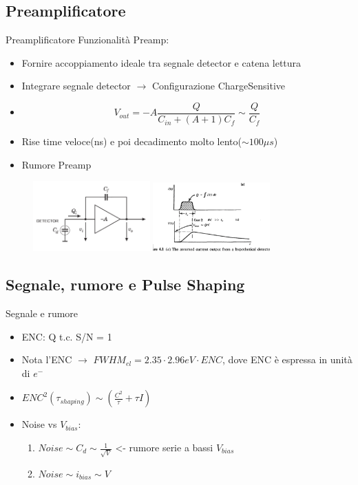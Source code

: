 \documentclass{beamer}
\begin{document}
\subsection{Preamplificatore}
\begin{frame}{Preamplificatore}
Funzionalità Preamp:
\begin{itemize}
    \item Fornire accoppiamento ideale tra segnale detector e catena lettura
    \item Integrare segnale detector $\to$ Configurazione Charge\-Sensitive
    \item \begin{equation}
            V_{out} = -A \frac{Q}{C_{in}+(A+1)C_f} \sim \frac{Q}{C_f}
        \end{equation}
    \item Rise time veloce(ns) e poi decadimento molto lento($\sim 100 \mu s$)
    \item Rumore Preamp
\end{itemize}

    \begin{figure}
\includegraphics[width=0.4\textwidth]{images/charge_sensitive_amplifier.png}
\includegraphics[width=0.4\textwidth]{images/scelta_RC.png}
\end{figure}
\end{frame}


\subsection{Segnale, rumore e Pulse Shaping}


\begin{frame}{Segnale e rumore}
    \begin{itemize}
    \item ENC: Q t.c. S/N = 1
    \item Nota l'ENC $\to$ $FWHM_{el} = 2.35 \cdot 2.96 eV \cdot  ENC $, dove ENC è espressa in unità di $e^-$
    \item $ENC^2(\tau_{shaping}) \sim (\frac{C^2}{\tau}+\tau I)$
    \item Noise vs $V_{bias}$: \begin{enumerate}
        \item $Noise \sim C_d \sim \frac{1}{\sqrt{V}}$ <- rumore serie a bassi $V_{bias}$
        \item $Noise \sim i_{bias} \sim V$
    \end{enumerate}
\end{itemize}
\end{frame}
\end{document}
